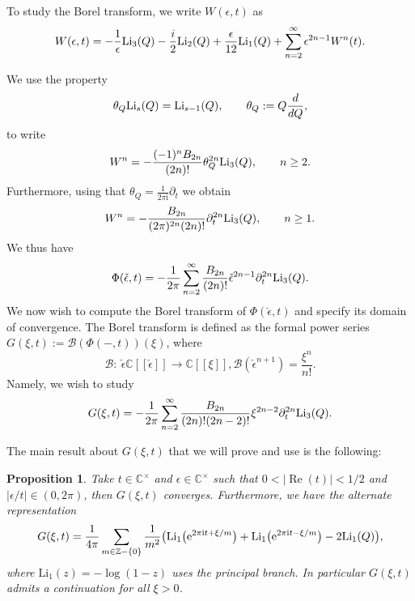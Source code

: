 \documentclass[pdftex]{sigma}
\numberwithin{equation}{section}
\newtheorem{Proposition}[Theorem]{Proposition}
 { \theoremstyle{definition}
\newtheorem{Definition}[Theorem]{Definition}
\newtheorem{Note}[Theorem]{Note}
\newtheorem{Example}[Theorem]{Example}
\newtheorem{Remark}[Theorem]{Remark} }
\begin{document}
To study the Borel transform, we write $W(\epsilon,t)$ as
\begin{equation*}
 W(\epsilon,t)=-\frac{1}{\epsilon}\mathrm{Li}_3(Q) -\frac{i}{2} {\rm Li}_2(Q) + \frac{\epsilon}{12} {\rm Li}_1(Q)+ \sum_{n=2}^{\infty} \epsilon^{2n-1} W^n(t).
\end{equation*}

We use the property
\begin{equation} \label{polylogder}
\theta_Q {\rm Li}_s(Q) ={\rm Li}_{s-1} (Q), \qquad \theta_Q:= Q \frac{d}{dQ},
\end{equation}
to write
\begin{equation}\label{derrep}
W^n=-\frac{(-1)^{n} B_{2n}}{(2n)!} \theta_Q^{2n} {\rm Li}_3(Q), \qquad n\ge 2.
\end{equation}
Furthermore, using that $\theta_Q=\frac{1}{2\pi \mathrm{i}}\partial_t$ we obtain
\begin{equation*}
 W^n=-\frac{ B_{2n}}{(2\pi)^{2n}(2n)!} \partial_t^{2n} {\rm Li}_3(Q), \qquad n\geq 1.
\end{equation*}
We thus have
\begin{equation}\label{formsumborel}
 \Phi(\check{\epsilon},t)=-\frac{1}{2\pi} \sum_{n=2}^{\infty}\frac{ B_{2n}}{(2n)!} \check{\epsilon}^{2n-1} \partial_t^{2n} {\rm Li}_3(Q).
\end{equation}
\fi
We now wish to compute the Borel transform of $\Phi(\check{\epsilon},t)$
and specify its domain of convergence.
The Borel transform is defined as the formal power series $G(\xi,t):=\mathcal{B}(\Phi(-,t))(\xi)$, where
\begin{equation*}
 \mathcal{B}\colon \ \check{\epsilon} \mathbb{C}[[\check{\epsilon}]]\to \mathbb{C}[[\xi]], \mathcal{B}(\check{\epsilon}^{n+1})=\frac{\xi^n}{n!}.
\end{equation*}
Namely, we wish to study
\begin{equation*}
 G(\xi,t)= -\frac{1}{2\pi}\sum_{n=2}^{\infty} \frac{ B_{2n}}{ (2n)! (2n-2)!} \xi^{2n-2} \partial_t^{2n} {\rm Li}_3(Q).
\end{equation*}

The main result about $G(\xi,t)$ that we will prove and use is the following:

\begin{Proposition}\label{Boreltransprop}
Take $t\in \mathbb{C}^{\times}$ and $\epsilon \in \mathbb{C}^{\times}$ such that $0<|\operatorname{Re}(t)|<1/2$ and $|\epsilon/t|\in (0,2\pi)$, then $G(\xi,t)$ converges. Furthermore, we have the alternate representation
\begin{equation}\label{Boreltrans2}
 G(\xi,t)=\frac{1}{4\pi}\sum_{m\in \mathbb{Z}-\{0\}} \frac{1}{m^2}\big(\mathrm{Li}_1\big({\rm e}^{2\pi \mathrm{i} t +\xi/m}\big) +\mathrm{Li}_1\big({\rm e}^{2\pi \mathrm{i} t -\xi/m}\big)-2\mathrm{Li}_1(Q)\big),
 \end{equation}
 where $\mathrm{Li}_1(z)=-\log(1-z)$ uses the principal branch. In particular $G(\xi,t)$ admits a continuation for all $\xi> 0$.
\end{Proposition}
\end{document}
